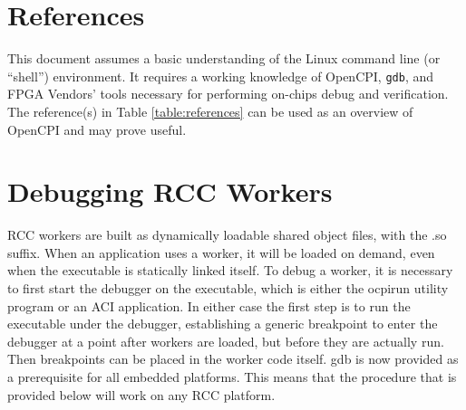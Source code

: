 \newpage

\tableofcontents

\newpage

\section{References}

	This document assumes a basic understanding of the Linux command line (or ``shell'') environment. It requires a working knowledge of OpenCPI, \texttt{gdb}, and FPGA Vendors' tools necessary for performing on-chips debug and verification. The reference(s) in Table \ref{table:references} can be used as an overview of OpenCPI and may prove useful.
\def\myreferences{
\hline
Xilinx's ChipScope Pro\footnote{Full title: ``ChipScope Pro Software and Cores (UG029)''} &
\url{http://www.xilinx.com/support/documentation/sw_manuals/xilinx14_5/chipscope_pro_sw_cores_ug029.pdf} \\
}

\newpage
\section{Debugging RCC Workers}
RCC workers are built as dynamically loadable shared object files, with the .so suffix.  When an application uses a worker, it will be loaded on demand, even when the executable is statically linked itself.  To debug a worker, it is necessary to first start the debugger on the executable, which is either the ocpirun utility program or an ACI application.  In either case the first step is to run the executable under the debugger, establishing a generic breakpoint to enter the debugger at a point after workers are loaded, but before they are actually run.  Then breakpoints can be placed in the worker code itself. gdb is now provided as a prerequisite for all embedded platforms.  This means that the procedure that is provided below will work on any RCC platform.
